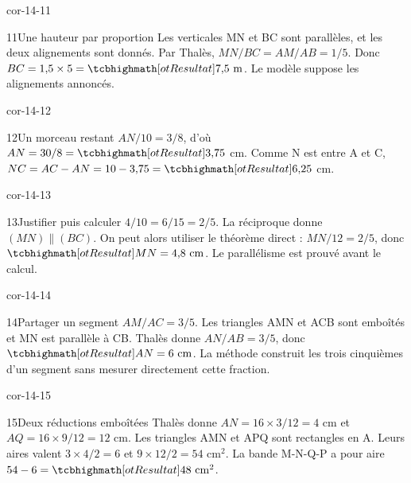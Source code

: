 \begin{blocLivre}{cor-14-11}\begin{corrige}{11}{Une hauteur par proportion}
Les verticales MN et BC sont parallèles, et les deux alignements sont donnés. Par Thalès, $MN/BC=AM/AB=1/5$. Donc $BC=1{,}5\times5=\res{7{,}5\ \mathrm m}$. Le modèle suppose les alignements annoncés.
\label{fig-cor-14-11}
\end{corrige}\end{blocLivre}
\begin{blocLivre}{cor-14-12}\begin{corrige}{12}{Un morceau restant}
$AN/10=3/8$, d’où $AN=30/8=\res{3{,}75}$ cm. Comme N est entre A et C, $NC=AC-AN=10-3{,}75=\res{6{,}25}$ cm.
\label{fig-cor-14-12}
\end{corrige}\end{blocLivre}
\begin{blocLivre}{cor-14-13}\begin{corrige}{13}{Justifier puis calculer}
$4/10=6/15=2/5$. La réciproque donne $(MN)\parallel(BC)$. On peut alors utiliser le théorème direct : $MN/12=2/5$, donc $\res{MN=4{,}8\ \mathrm{cm}}$. Le parallélisme est prouvé avant le calcul.
\label{fig-cor-14-13}
\end{corrige}\end{blocLivre}
\begin{blocLivre}{cor-14-14}\begin{corrige}{14}{Partager un segment}
$AM/AC=3/5$. Les triangles AMN et ACB sont emboîtés et MN est parallèle à CB. Thalès donne $AN/AB=3/5$, donc $\res{AN=6\ \mathrm{cm}}$. La méthode construit les trois cinquièmes d’un segment sans mesurer directement cette fraction.
\label{fig-cor-14-14}
\end{corrige}\end{blocLivre}
\begin{blocLivre}{cor-14-15}\begin{corrige}{15}{Deux réductions emboîtées}
Thalès donne $AN=16\times3/12=4$ cm et $AQ=16\times9/12=12$ cm. Les triangles AMN et APQ sont rectangles en A. Leurs aires valent $3\times4/2=6$ et $9\times12/2=54$ cm$^2$. La bande M-N-Q-P a pour aire $54-6=\res{48\ \mathrm{cm}^2}$.
\label{fig-cor-14-15}
\end{corrige}\end{blocLivre}
